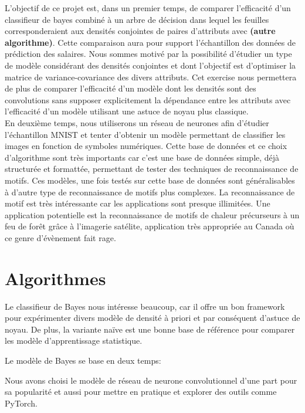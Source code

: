 \documentclass[12pt,letterpaper]{article}
\begin{document}
L'objectif de ce projet est, dans un premier temps, de comparer l'efficacité
d'un classifieur de bayes combiné à un arbre de décision dans lequel les
feuilles corresponderaient aux densités conjointes de paires d'attributs avec
\textbf{(autre algorithme)}. Cette comparaison aura pour support l'échantillon des
données de prédiction des salaires. Nous sommes motivé par la possibilité d'étudier 
un type de modèle considérant des densités conjointes et dont l'objectif est 
d'optimiser la matrice de variance-covariance des divers attributs. Cet exercise 
nous permettera de plus de comparer l'efficacité d'un modèle dont les densités 
sont des convolutions sans supposer explicitement la dépendance entre les 
attributs avec l'efficacité d'un modèle utilisant une astuce de noyau plus classique. \\

En deuxième temps, nous utiliserons un réseau de neurones afin d'étudier 
l'échantillon MNIST et tenter d'obtenir un modèle permettant de classifier les 
images en fonction de symboles numériques. Cette base de données et ce choix 
d'algorithme sont très importants car c'est une base de données simple, déjà 
structurée et formattée, permettant de tester des techniques de reconnaissance 
de motifs. Ces modèles, une fois testés sur cette base de données sont 
généralisables à d'autre type de reconnaissance de motifs plus complexes. 
La reconnaissance de motif est très intéressante car les 
applications sont presque illimitées. Une application potentielle est la 
reconnaissance de motifs de chaleur précurseurs à un feu de forêt grâce à 
l'imagerie satélite, application très appropriée au Canada où ce genre 
d'évènement fait rage. \\


\section{Algorithmes}

Le classifieur de Bayes nous intéresse beaucoup, car il offre un bon framework
pour expérimenter divers modèle de densité à priori et par conséquent d'astuce
de noyau. De plus, la variante naïve est une bonne base de référence pour
comparer les modèle d'apprentissage statistique.

Le modèle de Bayes se base en deux temps:

Nous avons choisi le modèle de réseau de neurone convolutionnel d'une part pour
sa popularité et aussi pour mettre en pratique et explorer des outils comme
PyTorch.
\end{document}

